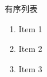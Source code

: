 \documentclass{ctexbeamer}
\begin{document}
\begin{frame}{有序列表}

\begin{enumerate}
  \item Item 1
  \item Item 2
  \item Item 3
\end{enumerate}

\end{frame}
\end{document}
